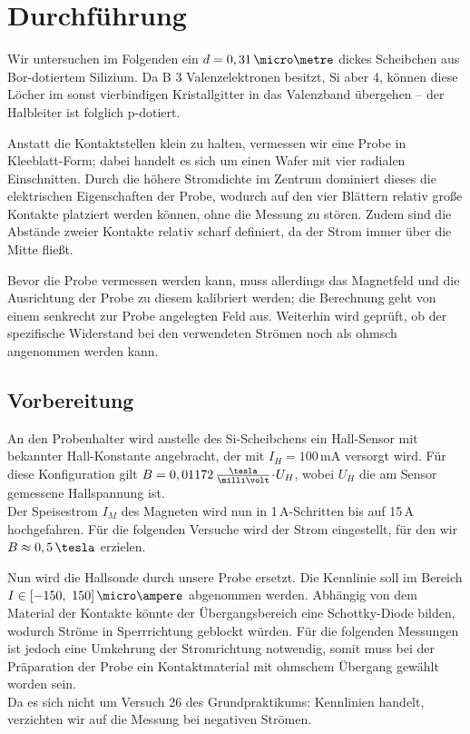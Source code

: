
\section{Durchführung}
Wir untersuchen im Folgenden ein $d = 0,31\,\micro\metre$ dickes Scheibchen aus Bor-dotiertem Silizium. Da \textsf{B} 3 Valenzelektronen besitzt, \textsf{Si} aber 4, können diese Löcher im sonst vierbindigen Kristallgitter in das Valenzband übergehen -- der Halbleiter ist folglich p-dotiert.

Anstatt die Kontaktstellen klein zu halten, vermessen wir eine Probe in Kleeblatt-Form; dabei handelt es sich um einen Wafer mit vier radialen Einschnitten. Durch die höhere Stromdichte im Zentrum dominiert dieses die elektrischen Eigenschaften der Probe, wodurch auf den vier \glqq Blättern\grqq{} relativ große Kontakte platziert werden können, ohne die Messung zu stören. Zudem sind die Abstände zweier Kontakte relativ scharf definiert, da der Strom immer über die Mitte fließt.

Bevor die Probe vermessen werden kann, muss allerdings das Magnetfeld und die Ausrichtung der Probe zu diesem kalibriert werden; die Berechnung geht von einem senkrecht zur Probe angelegten Feld aus. Weiterhin wird geprüft, ob der spezifische Widerstand bei den verwendeten Strömen noch als ohmsch angenommen werden kann.

\subsection{Vorbereitung}
An den Probenhalter wird anstelle des \textsf{Si}-Scheibchens ein Hall-Sensor mit bekannter Hall-Konstante angebracht, der mit $I_H = 100\,$mA versorgt wird. Für diese Konfiguration gilt $B = 0,01172 \,\tfrac{\tesla}{\milli\volt} \cdt U_H$, wobei $U_H$ die am Sensor gemessene Hallspannung ist.\\[1ex]
Der Speisestrom $I_M$ des Magneten wird nun in 1\,A-Schritten bis auf 15\,A hochgefahren. Für die folgenden Versuche wird der Strom eingestellt, für den wir $B \approx 0,5 \,\tesla$ erzielen.

Nun wird die Hallsonde durch unsere Probe ersetzt. Die Kennlinie soll im Bereich $I \in [-150,~150]\,\micro\ampere$ abgenommen werden. Abhängig von dem Material der Kontakte könnte der Übergangsbereich eine Schottky-Diode bilden, wodurch Ströme in Sperrrichtung geblockt würden. Für die folgenden Messungen ist jedoch eine Umkehrung der Stromrichtung notwendig, somit muss bei der Präparation der Probe ein Kontaktmaterial mit ohmschem Übergang gewählt worden sein.\\[1ex]
Da es sich nicht um Versuch 26 des Grundpraktikums: \glqq Kennlinien\grqq{} handelt, verzichten wir auf die Messung bei negativen Strömen.

